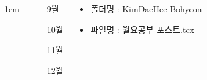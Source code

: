 \documentclass[	20pt, 
							a1paper, 
							portrait, %
							margin=0mm, %
							innermargin=10mm,  		%
							colspace=5mm, 
							subcolspace=0mm
							]{tikzposter}
\begin{document}
\begin{columns}


			{
					\setlength{\leftmargini}{4em}
					\setlength{\labelsep} {1em}
				\begin{LARGE}
					\begin{itemize}
					\item [9월]
					\item [10월] 
					\item [11월] 
					\item [12월] 
					\end{itemize}
				\end{LARGE}
			}




			{
				\begin{LARGE}
					\begin{itemize}
					\item 폴더명 : KimDaeHee-Bohyeon
					\item 파일명 : 월요공부-포스트.tex
					\end{itemize}
				\end{LARGE}
			}


	\end{columns}
\end{document}
